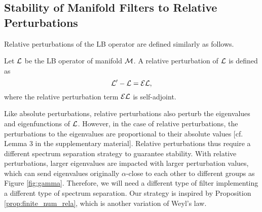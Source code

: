 

\subsection{Stability of Manifold Filters to Relative Perturbations}
\label{subsec:filter-relative}

Relative perturbations of the LB operator are defined similarly as follows.

\begin{definition} \label{def:rela-perturb}
Let ${\mathcal L}$ be the LB operator of manifold ${\mathcal M}$. A relative perturbation of ${\mathcal L}$ is defined as
\begin{equation}\label{eqn:rela-perturb}
{\ensuremath{\mathcal L}}'-{\mathcal L}={\mathcal E} {\mathcal L},
\end{equation}
where the relative perturbation term ${\mathcal E} {\mathcal L}$ is self-adjoint.
\end{definition}

Like absolute perturbations, relative perturbations also perturb the eigenvalues and eigenfunctions of ${\mathcal L}$. However, in the case of relative perturbations, the perturbations to the eigenvalues are proportional to their absolute values {[cf. Lemma 3 in the supplementary material]}. Relative perturbations thus require a different spectrum separation strategy to guarantee stability. With relative perturbations, larger eigenvalues are impacted with larger perturbation values, which can send eigenvalues originally $\alpha$-close to each other to different groups as Figure \ref{fig:gamma}. Therefore, we will need a different type of filter implementing a different type of spectrum separation. Our strategy is inspired by Proposition \ref{prop:finite_num_rela}, which is another variation of Weyl's law. 

